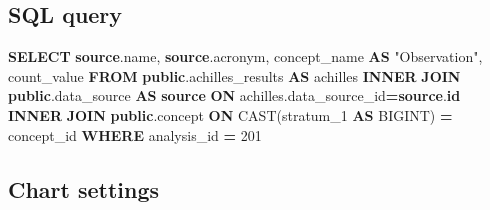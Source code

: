 \documentclass[
]{book}
\newenvironment{Shaded}{\begin{snugshade}}{\end{snugshade}}
\newcommand{\DecValTok}[1]{\textcolor[rgb]{0.00,0.00,0.81}{#1}}
\newcommand{\FunctionTok}[1]{\textcolor[rgb]{0.00,0.00,0.00}{#1}}
\newcommand{\KeywordTok}[1]{\textcolor[rgb]{0.13,0.29,0.53}{\textbf{#1}}}
\newcommand{\NormalTok}[1]{#1}
\newcommand{\OperatorTok}[1]{\textcolor[rgb]{0.81,0.36,0.00}{\textbf{#1}}}
\newcommand{\OtherTok}[1]{\textcolor[rgb]{0.56,0.35,0.01}{#1}}
\begin{document}
\hypertarget{sql-query-18}{%
\subsection{SQL query}\label{sql-query-18}}

\begin{Shaded}
\begin{Highlighting}[]
\KeywordTok{SELECT} \KeywordTok{source}\NormalTok{.name, }
       \KeywordTok{source}\NormalTok{.acronym,}
\NormalTok{       concept\_name }\KeywordTok{AS} \OtherTok{"Observation"}\NormalTok{, }
\NormalTok{       count\_value}
\KeywordTok{FROM} \KeywordTok{public}\NormalTok{.achilles\_results }\KeywordTok{AS}\NormalTok{ achilles }
\KeywordTok{INNER} \KeywordTok{JOIN} \KeywordTok{public}\NormalTok{.data\_source }\KeywordTok{AS} \KeywordTok{source} \KeywordTok{ON}\NormalTok{ achilles.data\_source\_id}\OperatorTok{=}\KeywordTok{source}\NormalTok{.}\KeywordTok{id}
\KeywordTok{INNER} \KeywordTok{JOIN} \KeywordTok{public}\NormalTok{.concept }\KeywordTok{ON} \FunctionTok{CAST}\NormalTok{(stratum\_1 }\KeywordTok{AS}\NormalTok{ BIGINT) }\OperatorTok{=}\NormalTok{ concept\_id}
\KeywordTok{WHERE}\NormalTok{ analysis\_id }\OperatorTok{=} \DecValTok{201}
\end{Highlighting}
\end{Shaded}

\hypertarget{chart-settings-18}{%
\subsection{Chart settings}\label{chart-settings-18}}
\end{document}
